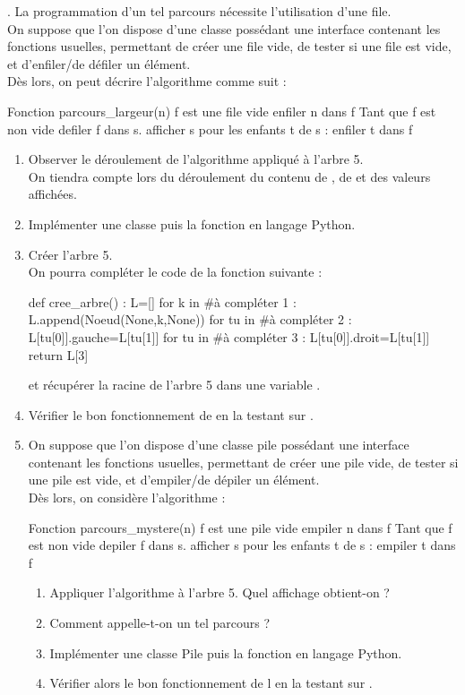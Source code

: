 \documentclass[11pt,a4paper,french,twoside]{PMCours}
\begin{document}
.\vskip -1.5cm La programmation d'un tel parcours nécessite l'utilisation d'une file.\\
On suppose que l'on dispose d'une classe  possédant une interface contenant les fonctions usuelles, permettant de créer une file vide, de tester si une file est vide, et d'enfiler/de défiler un élément. \medskip\\
Dès lors, on peut décrire l'algorithme comme suit : 
\begin{Python}
Fonction parcours_largeur(n) 
	f est une file vide
	enfiler n dans f
	Tant que f est non vide 
		defiler f dans s.
		afficher s
		pour les enfants t de s : 
			enfiler t dans f
\end{Python}	
\begin{enumerate}
\item Observer le déroulement de l'algorithme  appliqué à l'arbre 5. \\
On tiendra compte lors du déroulement du contenu de , de  et des valeurs affichées.
\item Implémenter une classe  puis la fonction  en langage Python.
\item Créer l'arbre 5.\\
On pourra compléter le code de la fonction suivante : 
\begin{Python}
def cree_arbre() :
    L=[]
    for k in #à compléter 1 :
        L.append(Noeud(None,k,None))
    for tu in #à compléter 2 :
        L[tu[0]].gauche=L[tu[1]]
    for tu in #à compléter 3 :
        L[tu[0]].droit=L[tu[1]]
    return L[3]
\end{Python}
et récupérer la racine de l'arbre 5 dans une variable .
\item Vérifier le bon fonctionnement de  en la testant sur .
\item On suppose que l'on dispose d'une classe pile possédant une interface contenant les fonctions usuelles, permettant de créer une pile vide, de tester si une pile est vide, et d'empiler/de dépiler un élément. \medskip\\
Dès lors, on considère l'algorithme : 
\begin{Python}
Fonction parcours_mystere(n) 
	f est une pile vide
	empiler n dans f
	Tant que f est non vide 
		depiler f dans s.
		afficher s
		pour les enfants t de s : 
			empiler t dans f
\end{Python}	
\begin{enumerate}
\item Appliquer l'algorithme  à l'arbre 5. Quel affichage obtient-on ? 
\item Comment appelle-t-on un tel parcours ?
\item Implémenter une classe Pile puis la fonction  en langage Python.
\item Vérifier alors le bon fonctionnement de l en la testant sur .
\end{enumerate}
\end{enumerate}
\end{document}
